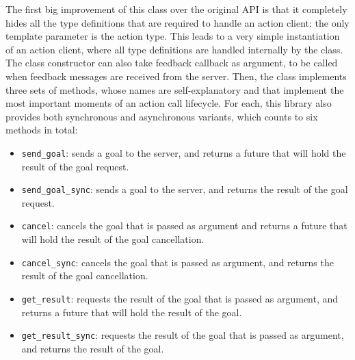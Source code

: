 The first big improvement of this class over the original API is that it completely hides all the type definitions that are required to handle an action client: the only template parameter is the action type. This leads to a very simple instantiation of an action client, where all type definitions are handled internally by the class. The class constructor can also take feedback callback as argument, to be called when feedback messages are received from the server. Then, the class implements three sets of methods, whose names are self-explanatory and that implement the most important moments of an action call lifecycle. For each, this library also provides both synchronous and asynchronous variants, which counts to six methods in total:
\begin{itemize}
  \item \texttt{send\_goal}: sends a goal to the server, and returns a future that will hold the result of the goal request.
  \item \texttt{send\_goal\_sync}: sends a goal to the server, and returns the result of the goal request.
  \item \texttt{cancel}: cancels the goal that is passed as argument and returns a future that will hold the result of the goal cancellation.
  \item \texttt{cancel\_sync}: cancels the goal that is passed as argument, and returns the result of the goal cancellation.
  \item \texttt{get\_result}: requests the result of the goal that is passed as argument, and returns a future that will hold the result of the goal.
  \item \texttt{get\_result\_sync}: requests the result of the goal that is passed as argument, and returns the result of the goal.
\end{itemize}

